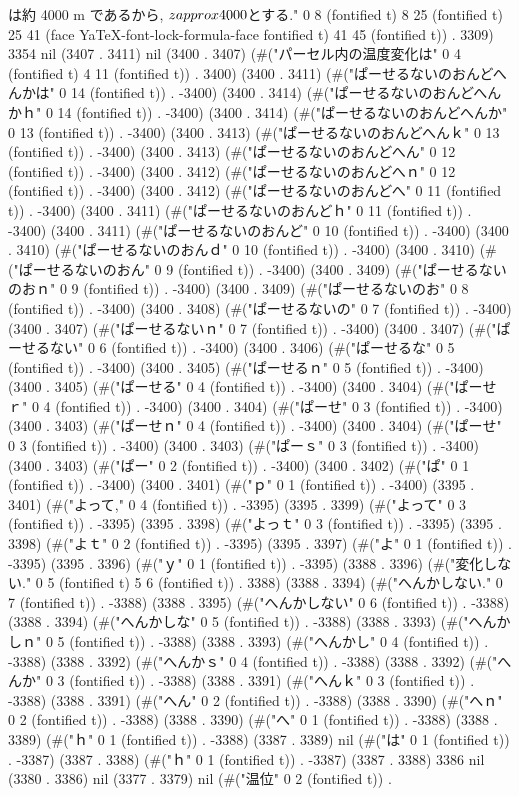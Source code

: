 は約 4000 m であるから, $z \\approx 4000$とする." 0 8 (fontified t) 8 25 (fontified t) 25 41 (face YaTeX-font-lock-formula-face fontified t) 41 45 (fontified t)) . 3309) 3354 nil (3407 . 3411) nil (3400 . 3407) (#("パーセル内の温度変化は" 0 4 (fontified t) 4 11 (fontified t)) . 3400) (3400 . 3411) (#("ぱーせるないのおんどへんかは" 0 14 (fontified t)) . -3400) (3400 . 3414) (#("ぱーせるないのおんどへんかｈ" 0 14 (fontified t)) . -3400) (3400 . 3414) (#("ぱーせるないのおんどへんか" 0 13 (fontified t)) . -3400) (3400 . 3413) (#("ぱーせるないのおんどへんｋ" 0 13 (fontified t)) . -3400) (3400 . 3413) (#("ぱーせるないのおんどへん" 0 12 (fontified t)) . -3400) (3400 . 3412) (#("ぱーせるないのおんどへｎ" 0 12 (fontified t)) . -3400) (3400 . 3412) (#("ぱーせるないのおんどへ" 0 11 (fontified t)) . -3400) (3400 . 3411) (#("ぱーせるないのおんどｈ" 0 11 (fontified t)) . -3400) (3400 . 3411) (#("ぱーせるないのおんど" 0 10 (fontified t)) . -3400) (3400 . 3410) (#("ぱーせるないのおんｄ" 0 10 (fontified t)) . -3400) (3400 . 3410) (#("ぱーせるないのおん" 0 9 (fontified t)) . -3400) (3400 . 3409) (#("ぱーせるないのおｎ" 0 9 (fontified t)) . -3400) (3400 . 3409) (#("ぱーせるないのお" 0 8 (fontified t)) . -3400) (3400 . 3408) (#("ぱーせるないの" 0 7 (fontified t)) . -3400) (3400 . 3407) (#("ぱーせるないｎ" 0 7 (fontified t)) . -3400) (3400 . 3407) (#("ぱーせるない" 0 6 (fontified t)) . -3400) (3400 . 3406) (#("ぱーせるな" 0 5 (fontified t)) . -3400) (3400 . 3405) (#("ぱーせるｎ" 0 5 (fontified t)) . -3400) (3400 . 3405) (#("ぱーせる" 0 4 (fontified t)) . -3400) (3400 . 3404) (#("ぱーせｒ" 0 4 (fontified t)) . -3400) (3400 . 3404) (#("ぱーせ" 0 3 (fontified t)) . -3400) (3400 . 3403) (#("ぱーせｎ" 0 4 (fontified t)) . -3400) (3400 . 3404) (#("ぱーせ" 0 3 (fontified t)) . -3400) (3400 . 3403) (#("ぱーｓ" 0 3 (fontified t)) . -3400) (3400 . 3403) (#("ぱー" 0 2 (fontified t)) . -3400) (3400 . 3402) (#("ぱ" 0 1 (fontified t)) . -3400) (3400 . 3401) (#("ｐ" 0 1 (fontified t)) . -3400) (3395 . 3401) (#("よって," 0 4 (fontified t)) . -3395) (3395 . 3399) (#("よって" 0 3 (fontified t)) . -3395) (3395 . 3398) (#("よっｔ" 0 3 (fontified t)) . -3395) (3395 . 3398) (#("よｔ" 0 2 (fontified t)) . -3395) (3395 . 3397) (#("よ" 0 1 (fontified t)) . -3395) (3395 . 3396) (#("ｙ" 0 1 (fontified t)) . -3395) (3388 . 3396) (#("変化しない." 0 5 (fontified t) 5 6 (fontified t)) . 3388) (3388 . 3394) (#("へんかしない." 0 7 (fontified t)) . -3388) (3388 . 3395) (#("へんかしない" 0 6 (fontified t)) . -3388) (3388 . 3394) (#("へんかしな" 0 5 (fontified t)) . -3388) (3388 . 3393) (#("へんかしｎ" 0 5 (fontified t)) . -3388) (3388 . 3393) (#("へんかし" 0 4 (fontified t)) . -3388) (3388 . 3392) (#("へんかｓ" 0 4 (fontified t)) . -3388) (3388 . 3392) (#("へんか" 0 3 (fontified t)) . -3388) (3388 . 3391) (#("へんｋ" 0 3 (fontified t)) . -3388) (3388 . 3391) (#("へん" 0 2 (fontified t)) . -3388) (3388 . 3390) (#("へｎ" 0 2 (fontified t)) . -3388) (3388 . 3390) (#("へ" 0 1 (fontified t)) . -3388) (3388 . 3389) (#("ｈ" 0 1 (fontified t)) . -3388) (3387 . 3389) nil (#("は" 0 1 (fontified t)) . -3387) (3387 . 3388) (#("ｈ" 0 1 (fontified t)) . -3387) (3387 . 3388) 3386 nil (3380 . 3386) nil (3377 . 3379) nil (#("温位" 0 2 (fontified t)) . 